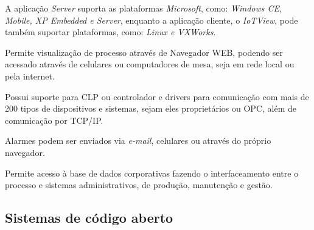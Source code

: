     \begin{alineascomponto}
    	\item A aplicação \textit{Server} suporta as plataformas \textit{Microsoft}, como: \textit{Windows CE, Mobile, XP Embedded e Server}, enquanto a aplicação cliente, o \textit{IoTView}, pode também suportar plataformas, como: \textit{Linux e VXWorks}.
    	\item Permite visualização de processo através de Navegador \gls{WEB}, podendo ser acessado através de celulares ou computadores de mesa, seja em rede local ou pela internet.
    	\item Possui suporte para \gls{CLP} ou controlador e drivers para comunicação com mais de 200 tipos de dispositivos e sistemas, sejam eles proprietários ou \gls{OPC}, além de comunicação por \gls{TCP/IP}.
    	\item Alarmes podem ser enviados via \textit{e-mail}, celulares ou através do próprio navegador.
    	\item Permite acesso à base de dados corporativas fazendo o interfaceamento entre o processo e sistemas administrativos, de produção, manutenção e gestão.
    \end{alineascomponto}
    
    \begin{figure}[!h]
    \end{figure}

\subsection{Sistemas de código aberto}
\label{sec:sistemas-aberto}

